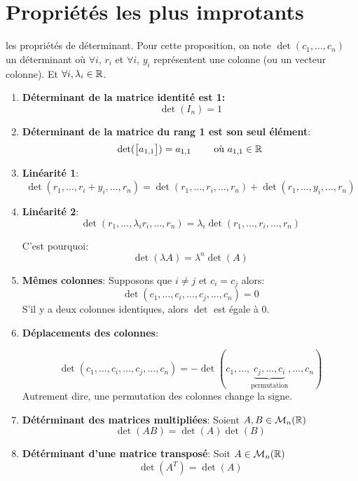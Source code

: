 \section{Propriétés les plus improtants}
\begin{prop} les propriétés de déterminant.
    Pour cette proposition, on note $\det(c_1, \ldots, c_n)$ un déterminant où $\forall i, \, r_i$ et $\forall i, \, y_i$ représentent une colonne (ou un vecteur colonne). Et $\forall i, \lambda_i \in \mathbb{R}$.
    \begin{enumerate}
        \item \textbf{Déterminant de la matrice identité est 1:}
            \[
            \det(I_n) = 1
            \] 
        \item \textbf{Déterminant de la matrice du rang 1 est son seul élément}:
            \[
                \det(\begin{bmatrix} a_{1,1} \end{bmatrix} ) = a_{1,1} \qquad \text{ où } a_{1,1} \in \mathbb{R}
            \] 
        \item \textbf{Linéarité 1}:
            \[
            \det(r_1, \ldots, r_i + y_i, \ldots, r_n) = \det(r_1, \ldots, r_i, \ldots, r_n) + \det(r_1, \ldots, y_i, \ldots, r_n)
            \] 
        \item \textbf{Linéarité 2}:
            \[
            \det(r_1, \ldots, \lambda_ir_i, \ldots, r_n) = \lambda_i\det(r_1, \ldots, r_i, \ldots, r_n) 
            \] 
            \begin{note}
               C'est pourquoi:
               \[
               \det(\lambda A) = \lambda^n\det(A)
               \] 
            \end{note}
        \item \textbf{Mêmes colonnes}: Supposons que $i \neq j$ et $c_i = c_j$ alors:
             \[
            \det(c_1, \ldots, c_i, \ldots, c_j, \ldots, c_n) = 0
            \] 
            S'il y a deux colonnes identiques, alors $\det$ est égale à 0.
        \item \textbf{Déplacements des colonnes}:
            
\[
    \det(c_1, \ldots, c_i, \ldots, c_j, \ldots, c_n) 
    = -\det(c_1, \ldots, 
    \underbrace{c_j , \ldots, 
    c_i}_{\text{permutation}}, \ldots, c_n)
\]
Autrement dire, une permutation des colonnes change la signe.

\item \textbf{Détérminant des matrices multipliées}: Soient $A, B \in \mathcal{M}_n(\mathbb{R})$
    \[
        \det(AB) = \det(A)\det(B) 
    \] 

\item \textbf{Détérminant d'une matrice transposé}: Soit $A \in \mathcal{M}_n(\mathbb{R})$
    \[
        \det(A^{T}) = \det(A)
    \] 


\end{enumerate}
\end{prop}

